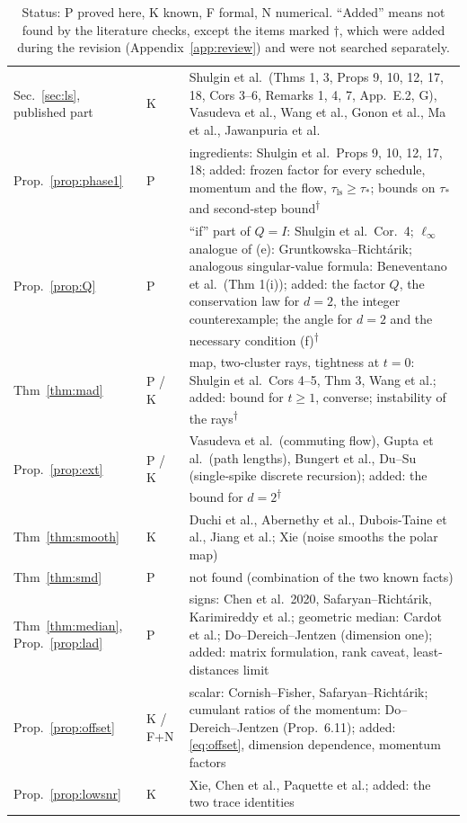 \documentclass[11pt]{article}
\theoremstyle{definition}
\theoremstyle{remark}
\begin{document}
\begin{table}[!t]
\begin{tabular}{@{}p{3.4cm}p{1.45cm}p{10.65cm}@{}}
Sec.~\ref{sec:ls}, published part & K & Shulgin et al.\ (Thms 1, 3, Props 9, 10, 12, 17, 18, Cors 3--6, Remarks 1, 4, 7, App.~E.2, G), Vasudeva et al., Wang et al., Gonon et al., Ma et al., Jawanpuria et al.\\
Prop.~\ref{prop:phase1} & P & ingredients: Shulgin et al.\ Props 9, 10, 12, 17, 18; added: frozen factor for every schedule, momentum and the flow, $\tau_{\mathrm{ls}}\ge\tau_\ast$; bounds on $\tau_\ast$ and second-step bound\textsuperscript{$\dagger$}\\
Prop.~\ref{prop:Q} & P & ``if'' part of $Q=I$: Shulgin et al.\ Cor.~4; $\ell_\infty$ analogue of (e): Gruntkowska--Richt\'arik; analogous singular-value formula: Beneventano et al.\ (Thm 1(i)); added: the factor $Q$, the conservation law for $d=2$, the integer counterexample; the angle for $d=2$ and the necessary condition (f)\textsuperscript{$\dagger$}\\
Thm~\ref{thm:mad} & P / K & map, two-cluster rays, tightness at $t=0$: Shulgin et al.\ Cors 4--5, Thm 3, Wang et al.; added: bound for $t\ge1$, converse; instability of the rays\textsuperscript{$\dagger$}\\
Prop.~\ref{prop:ext} & P / K & Vasudeva et al.\ (commuting flow), Gupta et al.\ (path lengths), Bungert et al., Du--Su (single-spike discrete recursion); added: the bound for $d=2$\textsuperscript{$\dagger$}\\
Thm~\ref{thm:smooth} & K & Duchi et al., Abernethy et al., Dubois-Taine et al., Jiang et al.; Xie (noise smooths the polar map)\\
Thm~\ref{thm:smd} & P & not found (combination of the two known facts)\\
Thm~\ref{thm:median}, Prop.~\ref{prop:lad} & P & signs: Chen et al.\ 2020, Safaryan--Richt\'arik, Karimireddy et al.; geometric median: Cardot et al.; Do--Dereich--Jentzen (dimension one); added: matrix formulation, rank caveat, least-distances limit\\
Prop.~\ref{prop:offset} & K / F+N & scalar: Cornish--Fisher, Safaryan--Richt\'arik; cumulant ratios of the momentum: Do--Dereich--Jentzen (Prop.~6.11); added: \eqref{eq:offset}, dimension dependence, momentum factors\\
Prop.~\ref{prop:lowsnr} & K & Xie, Chen et al., Paquette et al.; added: the two trace identities\\
\bottomrule
\end{tabular}
\caption{Status: P proved here, K known, F formal, N numerical. ``Added'' means not found by the literature checks, except the items marked $\dagger$, which were added during the revision (Appendix~\ref{app:review}) and were not searched separately.}\label{tab:status}
\end{table}
\end{document}
